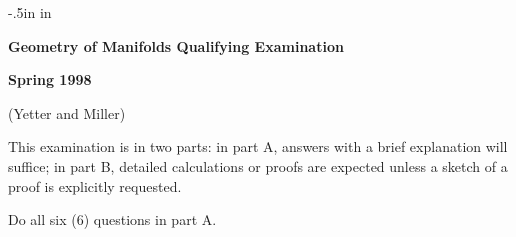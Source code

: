 

\topmargin -.5in
\textwidth 6.1in
 in



\centerline{\large \bf Geometry of Manifolds Qualifying Examination}

\centerline{\bf Spring 1998}

\centerline{(Yetter and Miller)}
\bigskip

	This examination is in two parts:  in part A, answers with a brief
explanation will suffice; in part B, detailed calculations or proofs are
expected unless a sketch of a proof is explicitly requested.
\smallskip

 Do all six (6) questions in part A. 
\smallskip

